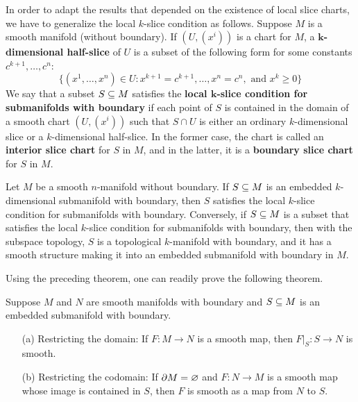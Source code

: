 In order to adapt the results that depended on the existence of local slice charts,
we have to generalize the local $k$-slice condition as follows. Suppose $M$ is a smooth manifold (without boundary). If $(U,(x^i))$ is a chart for $M$, a \textbf{$\bm{k}$-dimensional half-slice} of $U$ is a subset of the following form for some constants $c^{k+1},\dots,c^n$:
\[\{(x^1,\dots,x^n)\in U:x^{k+1}=c^{k+1},\dots,x^n=c^n,\text{ and }x^k\geq 0\}\]
We say that a subset $S\subseteq M$ satisfies the \textbf{local $\bm{k}$-slice condition for submanifolds with boundary} if each point of $S$ is contained in the domain of a smooth chart $(U,(x^i))$ such that $S\cap U$ is either an ordinary $k$-dimensional slice or a $k$-dimensional half-slice. In the former case, the chart is called an \textbf{interior slice chart} for $S$ in $M$, and in the latter, it is a \textbf{boundary slice chart} for $S$ in $M$.
\begin{proposition}
Let $M$ be a smooth $n$-manifold without boundary. If $S\subseteq M$ is an embedded $k$-dimensional submanifold with boundary, then $S$ satisfies the local $k$-slice condition for submanifolds with boundary. Conversely, if $S\subseteq M$ is a subset
that satisfies the local $k$-slice condition for submanifolds with boundary, then with the subspace topology, $S$ is a topological $k$-manifold with boundary, and it has a smooth structure making it into an embedded submanifold with boundary in $M$.
\end{proposition}
Using the preceding theorem, one can readily prove the following theorem.
\begin{theorem}
Suppose $M$ and $N$ are smooth manifolds with boundary and $S\subseteq M$ is an embedded submanifold with boundary.
\begin{itemize}
\item[(a)]Restricting the domain: If $F:M\to N$ is a smooth map, then $F|_S:S\to N$ is smooth.
\item[(b)]Restricting the codomain: If $\partial M=\varnothing$ and $F:N\to M$ is a smooth map whose image is contained in $S$, then $F$ is smooth as a map from $N$ to $S$.
\end{itemize}
\end{theorem}
